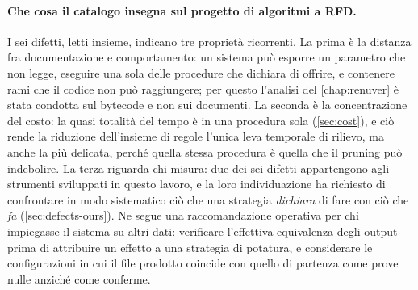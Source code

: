 \paragraph{Che cosa il catalogo insegna sul progetto di algoritmi a RFD.} I sei difetti, letti
insieme, indicano tre proprietà ricorrenti. La prima è la distanza fra documentazione e
comportamento: un sistema può esporre un parametro che non legge, eseguire una sola delle
procedure che dichiara di offrire, e contenere rami che il codice non può raggiungere; per questo
l'analisi del \autoref{chap:renuver} è stata condotta sul bytecode e non sui documenti. La seconda
è la concentrazione del costo: la quasi totalità del tempo è in una procedura sola
(\autoref{sec:cost}), e ciò rende la riduzione dell'insieme di regole l'unica leva temporale di
rilievo, ma anche la più delicata, perché quella stessa procedura è quella che il pruning può
indebolire. La terza riguarda chi misura: due dei sei difetti appartengono agli strumenti
sviluppati in questo lavoro, e la loro individuazione ha richiesto di confrontare in modo
sistematico ciò che una strategia \emph{dichiara} di fare con ciò che \emph{fa}
(\autoref{sec:defects-ours}). Ne segue una raccomandazione operativa per chi impiegasse il sistema
su altri dati: verificare l'effettiva equivalenza degli output prima di attribuire un effetto a
una strategia di potatura, e considerare le configurazioni in cui il file prodotto coincide con
quello di partenza come prove nulle anziché come conferme.
